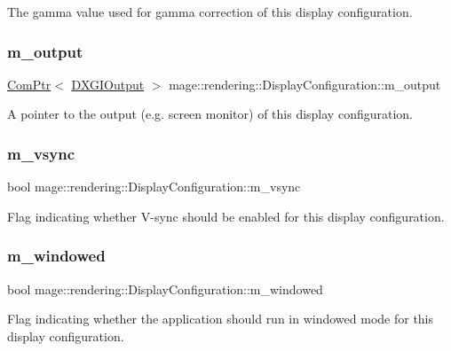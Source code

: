 The gamma value used for gamma correction of this display configuration. \hypertarget{classmage_1_1rendering_1_1_display_configuration_a3f43cbe5bb1a1a7c1bfb9ce66052fe0a}{}\label{classmage_1_1rendering_1_1_display_configuration_a3f43cbe5bb1a1a7c1bfb9ce66052fe0a} 
\subsubsection{\texorpdfstring{m\+\_\+output}{m\_output}}
{\footnotesize\ttfamily \hyperlink{namespacemage_ae74f374780900893caa5555d1031fd79}{Com\+Ptr}$<$ \hyperlink{namespacemage_1_1rendering_aaf22d3893277a4bd8497f6ea69b01532}{D\+X\+G\+I\+Output} $>$ mage\+::rendering\+::\+Display\+Configuration\+::m\+\_\+output\hspace{0.3cm}{\ttfamily [private]}}

A pointer to the output (e.\+g. screen monitor) of this display configuration. \hypertarget{classmage_1_1rendering_1_1_display_configuration_a749335db324a29c8b4ac30acf1c5361d}{}\label{classmage_1_1rendering_1_1_display_configuration_a749335db324a29c8b4ac30acf1c5361d} 
\subsubsection{\texorpdfstring{m\+\_\+vsync}{m\_vsync}}
{\footnotesize\ttfamily bool mage\+::rendering\+::\+Display\+Configuration\+::m\+\_\+vsync\hspace{0.3cm}{\ttfamily [private]}}

Flag indicating whether V-\/sync should be enabled for this display configuration. \hypertarget{classmage_1_1rendering_1_1_display_configuration_a9d2117628e8b8f6a9b6548a9c0b11c36}{}\label{classmage_1_1rendering_1_1_display_configuration_a9d2117628e8b8f6a9b6548a9c0b11c36} 
\subsubsection{\texorpdfstring{m\+\_\+windowed}{m\_windowed}}
{\footnotesize\ttfamily bool mage\+::rendering\+::\+Display\+Configuration\+::m\+\_\+windowed\hspace{0.3cm}{\ttfamily [private]}}

Flag indicating whether the application should run in windowed mode for this display configuration. 